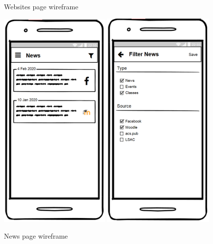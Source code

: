 \begin{figure}[!ht]
\begin{minipage}[t]{0.26\textwidth}
        \caption{Websites page wireframe}
        \label{4:fig:balsamiq_websites}
    \end{minipage}
    \hfill
    \begin{minipage}[t]{0.54\textwidth}
        \captionsetup{justification=centering}
        \includegraphics[width=0.485\textwidth]{figures/app/balsamiq/news.png}
        \includegraphics[width=0.49\textwidth]{figures/app/balsamiq/filter_news.png}
        \caption{News page wireframe}
        \label{4:fig:balsamiq_news}
    \end{minipage}
\end{figure}

